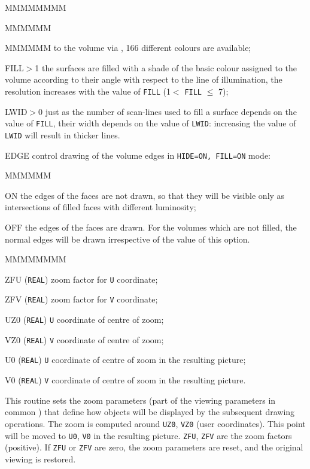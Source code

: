 \begin{DLtt}{MMMMMMMM}
\begin{DLtt}{MMMMMM}
\begin{DLtt}{MMMMMM}
to the volume via , 166 different colours are available;
\item[FILL$>$1] the surfaces are filled with a shade of the basic colour
assigned to the volume according to their angle with respect to the line
of illumination, the resolution
increases with the value of {\tt FILL} (1$<$ {\tt FILL} $\leq$ 7);
\item[LWID$>$0] just as the number of scan-lines used to fill a surface
depends on the value of {\tt FILL}, their width depends on the value of 
{\tt LWID}: increasing the value of {\tt LWID} will result in thicker lines.
\end{DLtt}
\end{DLtt}
\item[EDGE] control drawing of the volume edges in {\tt HIDE=ON, FILL=ON}
mode:
\begin{DLtt}{MMMMMM}
\item[ON] the edges of the faces are not drawn,
so that they will be visible only as intersections of filled faces
with different luminosity; 
\item[OFF] the edges of the faces are drawn.
For the volumes which are not filled, the normal
edges will be drawn irrespective of the value of this option.
\end{DLtt}
\end{DLtt}

\begin{DLtt}{MMMMMMMM}
\item[ZFU]    ({\tt REAL}) zoom factor for {\tt U} coordinate;
\item[ZFV]    ({\tt REAL}) zoom factor for {\tt V} coordinate;
\item[UZ0]    ({\tt REAL}) {\tt U} coordinate of centre of zoom;
\item[VZ0]    ({\tt REAL}) {\tt V} coordinate of centre of zoom;
\item[U0]     ({\tt REAL}) {\tt U} coordinate of centre of zoom 
in the resulting picture;
\item[V0]     ({\tt REAL}) {\tt V} coordinate of centre of zoom 
in the resulting picture.
\end{DLtt}
This routine sets the zoom parameters (part of the viewing parameters 
in common ) that define how objects 
will be displayed by the subsequent drawing operations.
The zoom is computed around {\tt UZ0}, {\tt VZ0} (user coordinates).
This point will be moved to {\tt U0}, {\tt V0} in the resulting picture.
{\tt ZFU}, {\tt ZFV} are the zoom factors (positive). If {\tt ZFU} 
or {\tt ZFV} are zero, the zoom parameters are reset, and the 
original viewing is restored.

